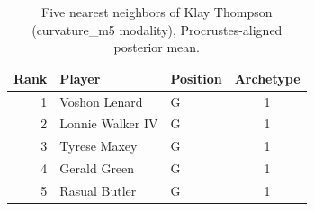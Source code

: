 \begin{table}[htbp]
  \centering\small
  \begin{tabular}{rllc}
    \toprule
    Rank & Player & Position & Archetype \\
    \midrule
    1 & Voshon Lenard & G & 1 \\
    2 & Lonnie Walker IV & G & 1 \\
    3 & Tyrese Maxey & G & 1 \\
    4 & Gerald Green & G & 1 \\
    5 & Rasual Butler & G & 1 \\
    \bottomrule
  \end{tabular}
  \caption{Five nearest neighbors of Klay Thompson (curvature_m5 modality), Procrustes-aligned posterior mean.}
  \label{tab:Klay_Thompson_neighbors_curvature_m5}
\end{table}

